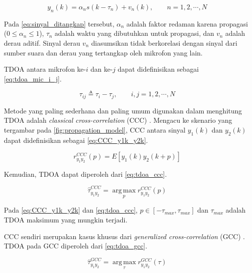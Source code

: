 \begin{equation}\label{eq:sinyal_ditangkap}
y_{n}(k) = \alpha_{n}s(k - \tau_{n}) + v_{n}(k), \qquad n = 1, 2, \cdots, N
\end{equation}

Pada \autoref{eq:sinyal_ditangkap} tersebut, $\alpha_{n}$ adalah faktor redaman karena propagasi ($0 \leq \alpha_{n} \leq 1$), $\tau_{n}$ adalah waktu yang dibutuhkan untuk propagasi, dan $v_{n}$ adalah derau aditif. Sinyal derau $v_{n}$ diasumsikan tidak berkorelasi dengan sinyal dari sumber suara dan derau yang tertangkap oleh mikrofon yang lain.

TDOA antara mikrofon ke-$i$ dan ke-$j$ dapat didefinisikan sebagai \autoref{eq:tdoa_mic_i_j}.

\begin{equation}\label{eq:tdoa_mic_i_j}
\tau_{ij} \triangleq \tau_{i} - \tau_{j}, \qquad i,j = 1, 2, \cdots, N
\end{equation}

Metode yang paling sederhana dan paling umum digunakan dalam menghitung TDOA adalah \textit{classical cross-correlation} (CCC) \cite{huang2008, benesty2008, chen2004}. Mengacu ke skenario yang tergambar pada \autoref{fig:propagation_model}, CCC antara sinyal $y_{1}(k)$ dan $y_{2}(k)$ dapat didefinisikan sebagai \autoref{eq:CCC_y1k_y2k}.

\begin{equation}\label{eq:CCC_y1k_y2k}
r^{CCC}_{y_{1} y_{2}} (p) = E [y_{1} (k) y_{2} (k + p)]
\end{equation}
 
Kemudian, TDOA dapat diperoleh dari \autoref{eq:tdoa_ccc}.

\begin{equation}\label{eq:tdoa_ccc}
\widehat{\tau}^{CCC}_{y_{1} y_{2}} = \operatorname*{arg\,max}_p r^{CCC}_{y_{1} y_{2}} (p)
\end{equation}

Pada \autoref{eq:CCC_y1k_y2k} dan \autoref{eq:tdoa_ccc}, $p \in [ -\tau_{max} , \tau_{max} ]$ dan $\tau_{max}$ adalah TDOA maksimum yang mungkin terjadi.

CCC sendiri merupakan kasus khusus dari \textit{generalized cross-correlation} (GCC) \cite{huang2008, benesty2008, chen2004}. TDOA pada GCC diperoleh dari \autoref{eq:tdoa_gcc}.

\begin{equation}\label{eq:tdoa_gcc}
\widehat{\tau}^{GCC}_{y_{1} y_{2}} = \operatorname*{arg\,max}_\tau r^{GCC}_{y_{1} y_{2}} (\tau)
\end{equation}


